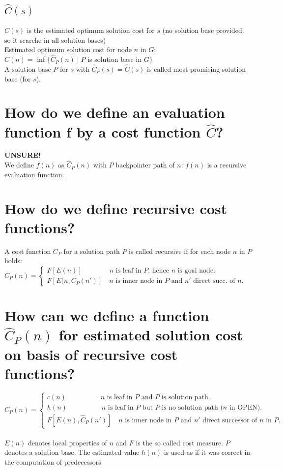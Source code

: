\documentclass[12pt, a4paper]{article}
\begin{document}
\subsection{$\hat{C}(s)$}
$\hat{C}(s)$ is the estimated optimum solution cost for $s$ (no solution base provided. so it searche in all solution bases) \\
Estimated optimum solution cost for node $n$ in $G$: \\
$\hat{C}(n) = $ inf $\{\hat{C}_P(n) \mid P $ is solution base in $G\}$ \\
A solution base $P$ for $s$ with $\hat{C}_P(s) = \hat{C}(s)$ is called most promising solution base (for $s$).

\section{How do we define an evaluation function f by a cost function $\hat{C}$?}
\textbf{UNSURE!} \\
We define $f(n)$ as $\hat{C}_P(n)$ with $P$ backpointer path of $n$: $f(n)$ is a recursive evaluation function.

\section{How do we define recursive cost functions?}
A cost function $C_P$ for a solution path $P$ is called recursive if for each node $n$ in $P$ holds:
$C_P(n) =  
\begin{cases}
F[E(n)] \quad \quad \quad \quad \text{$n$ is leaf in $P$, hence $n$ is goal node.} \\
F[E(n, C_P(n')] \quad \text{$n$ is inner node in $P$ and $n'$ direct succ. of $n$.}
\end{cases}
$

\section{How can we define a function $\hat{C}_P(n)$ for estimated solution cost on basis of recursive cost functions?}
$\hat{C}_P(n) =  
\begin{cases}
c(n) \quad \quad \quad \quad \quad \text{$n$ is leaf in $P$ and $P$ is solution path.} \\
h(n) \quad \quad \quad \quad \quad \text{$n$ is leaf in $P$ but $P$ is no solution path ($n$ in OPEN).} \\
F[E(n), \hat{C}_P(n')] \quad \text{$n$ is inner node in $P$ and $n'$ direct successor of $n$ in $P$.}
\end{cases}
$
\\\\
$E(n)$ denotes local properties of $n$ and $F$ is the so called cost measure. 
$P$ denotes a solution base. The estimated value $h(n)$ is used as if it was correct in the computation of predecessors.
\end{document}
